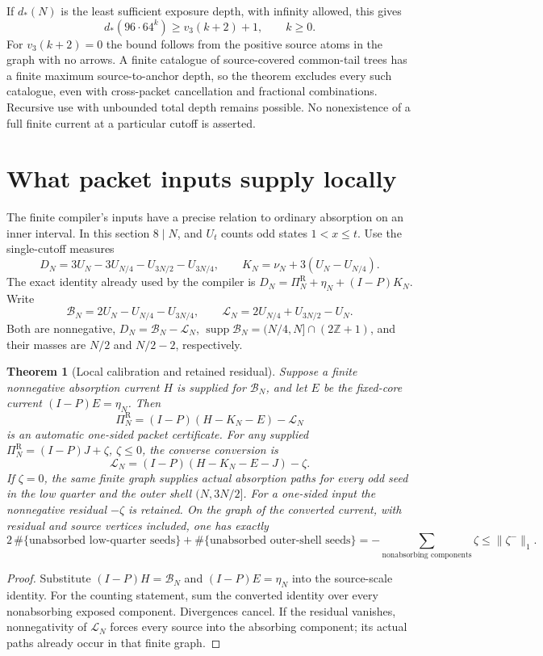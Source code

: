 \documentclass[11pt]{article}
\newtheorem{theorem}{Theorem}
\newcommand{\PiR}{\Pi^{\mathrm R}}
\newcommand{\supp}{\operatorname{supp}}
\begin{document}
If $d_*(N)$ is the least sufficient exposure depth, with infinity allowed,
this gives
\[
 d_*(96\cdot64^k)\ge v_3(k+2)+1,\qquad k\ge0.
\]
For $v_3(k+2)=0$ the bound follows from the positive source atoms in the
graph with no arrows. A finite catalogue of source-covered common-tail
trees has a finite maximum source-to-anchor depth, so the theorem
excludes every such catalogue, even with cross-packet cancellation and
fractional combinations. Recursive use with unbounded total depth remains
possible. No nonexistence of a full finite current at a particular
cutoff is asserted.

\section{What packet inputs supply locally}
The finite compiler's inputs have a precise relation to ordinary
absorption on an inner interval. In this section $8\mid N$, and $U_t$
counts odd states $1<x\le t$. Use the single-cutoff measures
\[
 D_N=3U_N-3U_{N/4}-U_{3N/2}-U_{3N/4},\qquad
 K_N=\nu_N+3(U_N-U_{N/4}).
\]
The exact identity already used by the compiler is
$D_N=\PiR_N+\eta_N+(I-P)K_N$.
Write
\[
 \mathcal B_N=2U_N-U_{N/4}-U_{3N/4},\qquad
 \mathcal L_N=2U_{N/4}+U_{3N/2}-U_N.
\]
Both are nonnegative, $D_N=\mathcal B_N-\mathcal L_N$,
$\supp\mathcal B_N=(N/4,N]\cap(2\mathbb Z+1)$, and their masses are
$N/2$ and $N/2-2$, respectively.

\begin{theorem}[Local calibration and retained residual]\label{thm:localinput}
Suppose a finite nonnegative absorption current $H$ is supplied for
$\mathcal B_N$, and let $E$ be the fixed-core current
$(I-P)E=\eta_N$. Then
\[
 \PiR_N=(I-P)(H-K_N-E)-\mathcal L_N
\]
is an automatic one-sided packet certificate.
For any supplied $\PiR_N=(I-P)J+\zeta$, $\zeta\le0$, the converse
conversion is
\[
 \mathcal L_N=(I-P)(H-K_N-E-J)-\zeta.
\]
If $\zeta=0$, the same finite graph supplies actual absorption paths
for every odd seed in the low quarter and the outer shell $(N,3N/2]$.
For a one-sided input the nonnegative residual $-\zeta$ is retained.
On the graph of the converted current, with residual and source vertices
included, one has exactly
\[
 2\,\#\{\text{unabsorbed low-quarter seeds}\}
 +\#\{\text{unabsorbed outer-shell seeds}\}
 =-\sum_{\text{nonabsorbing components}}\zeta
 \le\|\zeta^-\|_1.
\]
\end{theorem}
\begin{proof}
Substitute $(I-P)H=\mathcal B_N$ and $(I-P)E=\eta_N$ into the
source-scale identity. For the counting statement, sum the converted
identity over every nonabsorbing exposed component. Divergences cancel.
If the residual vanishes, nonnegativity of $\mathcal L_N$ forces every
source into the absorbing component; its actual paths already occur
in that finite graph.
\end{proof}
\end{document}
